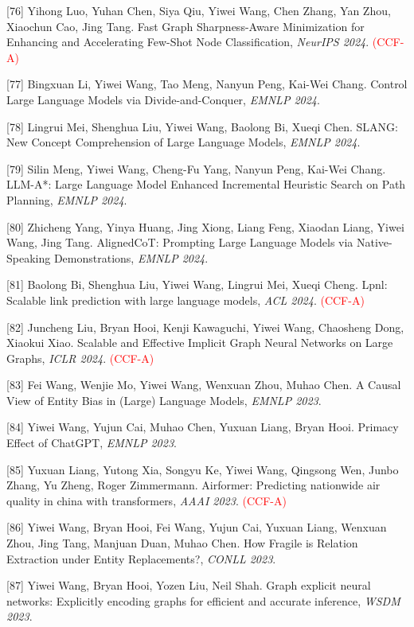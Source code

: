 [76] Yihong Luo, Yuhan Chen, Siya Qiu, Yiwei Wang, Chen Zhang, Yan Zhou, Xiaochun Cao, Jing Tang. Fast Graph Sharpness-Aware Minimization for Enhancing and Accelerating Few-Shot Node Classification, \textit{NeurIPS 2024}. \textcolor{red}{(CCF-A)}

[77] Bingxuan Li, Yiwei Wang, Tao Meng, Nanyun Peng, Kai-Wei Chang. Control Large Language Models via Divide-and-Conquer, \textit{EMNLP 2024}.

[78] Lingrui Mei, Shenghua Liu, Yiwei Wang, Baolong Bi, Xueqi Chen. SLANG: New Concept Comprehension of Large Language Models, \textit{EMNLP 2024}.

[79] Silin Meng, Yiwei Wang, Cheng-Fu Yang, Nanyun Peng, Kai-Wei Chang. LLM-A*: Large Language Model Enhanced Incremental Heuristic Search on Path Planning, \textit{EMNLP 2024}.

[80] Zhicheng Yang, Yinya Huang, Jing Xiong, Liang Feng, Xiaodan Liang, Yiwei Wang, Jing Tang. AlignedCoT: Prompting Large Language Models via Native-Speaking Demonstrations, \textit{EMNLP 2024}.

[81] Baolong Bi, Shenghua Liu, Yiwei Wang, Lingrui Mei, Xueqi Cheng. Lpnl: Scalable link prediction with large language models, \textit{ACL 2024}. \textcolor{red}{(CCF-A)}

[82] Juncheng Liu, Bryan Hooi, Kenji Kawaguchi, Yiwei Wang, Chaosheng Dong, Xiaokui Xiao. Scalable and Effective Implicit Graph Neural Networks on Large Graphs, \textit{ICLR 2024}. \textcolor{red}{(CCF-A)}

[83] Fei Wang, Wenjie Mo, Yiwei Wang, Wenxuan Zhou, Muhao Chen. A Causal View of Entity Bias in (Large) Language Models, \textit{EMNLP 2023}.

[84] Yiwei Wang, Yujun Cai, Muhao Chen, Yuxuan Liang, Bryan Hooi. Primacy Effect of ChatGPT, \textit{EMNLP 2023}.

[85] Yuxuan Liang, Yutong Xia, Songyu Ke, Yiwei Wang, Qingsong Wen, Junbo Zhang, Yu Zheng, Roger Zimmermann. Airformer: Predicting nationwide air quality in china with transformers, \textit{AAAI 2023}. \textcolor{red}{(CCF-A)}

[86] Yiwei Wang, Bryan Hooi, Fei Wang, Yujun Cai, Yuxuan Liang, Wenxuan Zhou, Jing Tang, Manjuan Duan, Muhao Chen. How Fragile is Relation Extraction under Entity Replacements?, \textit{CONLL 2023}.

[87] Yiwei Wang, Bryan Hooi, Yozen Liu, Neil Shah. Graph explicit neural networks: Explicitly encoding graphs for efficient and accurate inference, \textit{WSDM 2023}.

